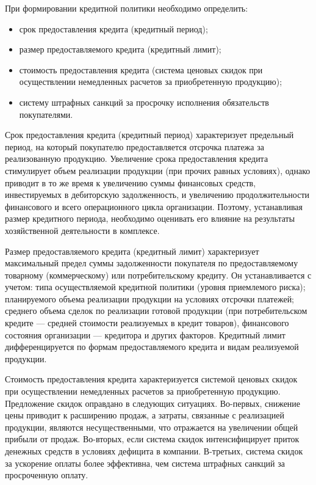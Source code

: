 При формировании кредитной политики необходимо определить:
\begin{itemize}
	\item срок предоставления кредита (кредитный период);
	\item размер предоставляемого кредита (кредитный лимит);
	\item стоимость предоставления кредита (система ценовых скидок при осуществлении немедленных расчетов за приобретенную продукцию);
	\item систему штрафных санкций за просрочку исполнения обязательств покупателями.
\end{itemize}

Срок предоставления кредита (кредитный период) характеризует предельный период, на который покупателю предоставляется отсрочка платежа за реализованную продукцию.
Увеличение срока предоставления кредита стимулирует объем реализации продукции (при прочих равных условиях), однако приводит в то же время к увеличению суммы финансовых средств, инвестируемых в дебиторскую задолженность, и увеличению продолжительности финансового и всего операционного цикла организации.
Поэтому, устанавливая размер кредитного периода, необходимо оценивать его влияние на результаты хозяйственной деятельности в комплексе.

Размер предоставляемого кредита (кредитный лимит) характеризует максимальный предел суммы задолженности покупателя по предоставляемому товарному (коммерческому) или потребительскому кредиту.
Он устанавливается с учетом: типа осуществляемой кредитной политики (уровня приемлемого риска); планируемого объема реализации продукции на условиях отсрочки платежей; среднего объема сделок по реализации готовой продукции (при потребительском кредите --- средней стоимости реализуемых в кредит товаров), финансового состояния организации --- кредитора и других факторов.
Кредитный лимит дифференцируется по формам предоставляемого кредита и видам реализуемой продукции.

Стоимость предоставления кредита характеризуется системой ценовых скидок при осуществлении немедленных расчетов за приобретенную продукцию.
Предложение скидок оправдано в следующих ситуациях.
Во-первых, снижение цены приводит к расширению продаж, а затраты, связанные с реализацией продукции, являются несущественными, что отражается на увеличении общей прибыли от продаж.
Во-вторых, если система скидок интенсифицирует приток денежных средств в условиях дефицита в компании.
В-третьих, система скидок за ускорение оплаты более эффективна, чем система штрафных санкций за просроченную оплату.

